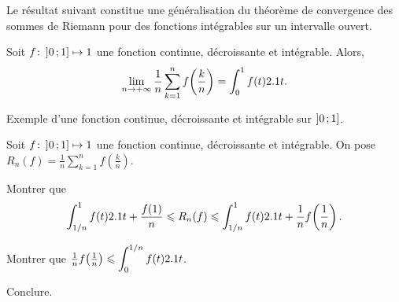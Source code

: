 


\medskip

Le résultat suivant constitue une généralisation du théorème de convergence des sommes de Riemann pour des fonctions intégrables sur un intervalle ouvert.

\begin{prop}
    Soit $\fonctionligne[f]{\interof{0}{1}}{\R}$ une fonction continue, décroissante et intégrable. Alors,
    \[
    \lim\limits_{n \to +\infty} \frac{1}{n} \sum\limits_{k=1}^n f\mathopen{}\left(\frac{k}{n}\right) =\int_0^1 f(t) \d t.
    \]
\end{prop}

\begin{marginfigure}
    \centering
    
    \caption{Exemple d'une fonction continue, décroissante et intégrable sur $\interof{0}{1}$.}
\end{marginfigure}

\begin{exercice}
Soit $\fonctionligne[f]{\interof{0}{1}}{\R}$ une fonction continue, décroissante et intégrable. On pose \mbox{$R_n(f) = \frac{1}{n} \sum\limits_{k=1}^n f\mathopen{}\left(\frac{k}{n}\right)$}.
\begin{questions}
\item Montrer que
\[
\displaystyle\int_{1/n}^1 f(t) \d t + \frac{f(1)}{n}
\leqslant R_n(f)
\leqslant \displaystyle\int_{1/n}^1 f(t) \d t + \frac{1}{n}  f\mathopen{}\left(\frac{1}{n}\right).
\]

\item Montrer que $\frac{1}{n} f\mathopen{}\left(\frac{1}{n}\right) \leqslant \displaystyle\int_0^{1/n} f(t) \d t$.

\item Conclure.
\end{questions}
\end{exercice}



